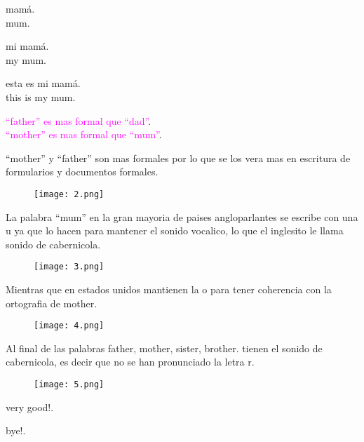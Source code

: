 mamá.\\
mum.

mi mamá.\\
my mum.

esta es mi mamá.\\
this is my mum.

\textcolor{magenta}{``father'' es mas formal que ``dad''}.\\
\textcolor{magenta}{``mother'' es mas formal que ``mum''}.

``mother'' y ``father'' son mas formales por lo que se los vera mas en
escritura de formularios y documentos formales.

\begin{figure}[H]
\centering
\texttt{[image: 2.png]}
\end{figure}

La palabra ``mum'' en la gran mayoria de paises angloparlantes se escribe
con una u ya que lo hacen para mantener el sonido vocalico, lo que el
inglesito le llama sonido de cabernicola.

\begin{figure}[H]
\centering
\texttt{[image: 3.png]}
\end{figure}

Mientras que en estados unidos mantienen la o para tener coherencia con
la ortografia de mother.

\begin{figure}[H]
\centering
\texttt{[image: 4.png]}
\end{figure}

Al final de las palabras father, mother, sister, brother. tienen el sonido
de cabernicola, es decir que no se han pronunciado la letra r.

\begin{figure}[H]
\centering
\texttt{[image: 5.png]}
\end{figure}

very good!.

bye!.


